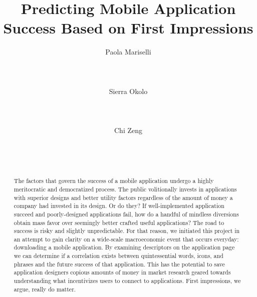 \documentclass{sigchi}
\begin{document}
\title{Predicting Mobile Application Success Based on First Impressions}

\author{
  \alignauthor Paola Mariselli\\
    \\
    \\
    \\
  \alignauthor Sierra Okolo\\
    \\
    \\
    \\
  \alignauthor Chi Zeng\\
    \\
    \\
    \\
}

\maketitle
\begin{abstract}
The factors that govern the success of a mobile application undergo a highly meritocratic and democratized process.  The public volitionally invests in applications with superior designs and better utility factors regardless of the amount of money a company had invested in its design.  Or do they? If well-implemented application succeed and poorly-designed applications fail, how do a handful of mindless diversions obtain mass favor over seemingly better crafted useful applications?   The road to success is risky and slightly unpredictable.  For that reason, we initiated this project in an attempt to gain clarity on a wide-scale macroeconomic event that occurs everyday: downloading a mobile application.  By examining descriptors on the application page we can determine if a correlation exists between quintessential words, icons, and phrases and the future success of that application.  This has the potential to save application designers copious amounts of money in market research geared towards understanding what incentivizes users to connect to applications. First impressions, we argue, really do matter.
\end{abstract}











\end{document}
